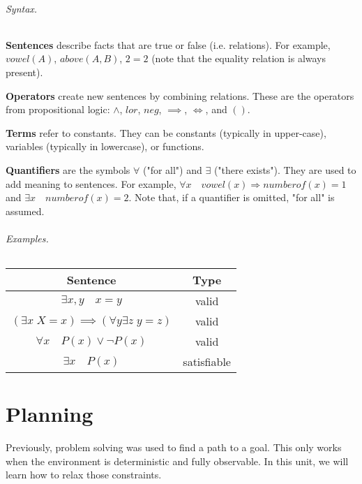 \documentclass[10pt,a4paper]{article}
\newenvironment{itemize_packed}{
\begin{itemize}
\setlength{\itemsep}{0pt}
\setlength{\parskip}{0pt}
}{\end{itemize}}
\begin{document}
\paragraph{Syntax.}
\begin{itemize_packed}
\item \textbf{Sentences} describe facts that are true or false (i.e. relations). For example, $vowel(A)$, $above(A,B)$, $2=2$ (note that the equality relation is always present).
\item \textbf{Operators} create new sentences by combining relations. These are the operators from propositional logic: $\land$, $lor$, $neg$, $\implies$, $\iff$, and $()$.
\item \textbf{Terms} refer to constants. They can be constants (typically in upper-case), variables (typically in lowercase), or functions.
\item \textbf{Quantifiers} are the symbols $\forall$ ("for all") and $\exists$ ("there exists"). They are used to add meaning to sentences. For example, $\forall x\quad vowel(x)\Rightarrow numberof(x) = 1$ and $\exists x\quad numberof(x)=2$. Note that, if a quantifier is omitted, "for all" is assumed.
\end{itemize_packed}

\paragraph{Examples.}
\begin{center}
\begin{tabular}{c c}
\textbf{Sentence} & \textbf{Type} \\
\hline
$\exists x,y \quad x=y$ & valid \\
$\left(\exists x \; X=x\right) \implies \left(\forall y \exists z \; y=z\right)$ & valid \\
$\forall x\quad P(x) \lor \neg P(x)$ & valid \\
$\exists x\quad P(x)$ & satisfiable
\end{tabular}
\end{center}


\part{Planning}

Previously, problem solving was used to find a path to a goal. This only works when the environment is deterministic and fully observable. In this unit, we will learn how to relax those constraints.
\end{document}
